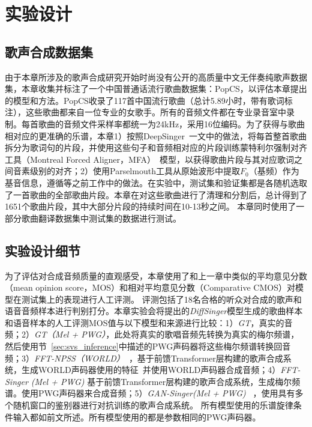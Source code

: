 \section{实验设计}
\subsection{歌声合成数据集}
由于本章所涉及的歌声合成研究开始时尚没有公开的高质量中文无伴奏纯歌声数据集，本章收集并标注了一个中国普通话流行歌曲数据集：PopCS，以评估本章提出的模型和方法。PopCS收录了117首中国流行歌曲（总计5.89小时，带有歌词标注），这些歌曲都来自一位专业的女歌手。所有的音频文件都在专业录音室中录制。每首歌曲的音频文件采样率都统一为24kHz，采用16位编码。为了获得与歌曲相对应的更准确的乐谱，本章1）按照DeepSinger~\citep{ren2020deepsinger}一文中的做法，将每首整首歌曲拆分为歌词句的片段，并使用这些句子和音频相对应的片段训练蒙特利尔强制对齐工具（Montreal Forced Aligner，MFA）~\citep{mcauliffe2017montreal}模型，以获得歌曲片段与其对应歌词之间音素级别的对齐；2）使用Parselmouth工具从原始波形中提取$F_0$（基频）作为基音信息，遵循\citet{wu2020adversarially,blaauw2020sequence,ren2020deepsinger}等之前工作中的做法。在实验中，测试集和验证集都是各随机选取了一首歌曲的全部歌曲片段。本章在对这些歌曲进行了清理和分割后，总计得到了1651个歌曲片段，其中大部分片段的持续时间在10-13秒之间。
本章同时使用了一部分歌曲翻译数据集中测试集的数据进行测试。
\subsection{实验设计细节}
为了评估对合成音频质量的直观感受，本章使用了和上一章中类似的平均意见分数（mean opinion score，MOS）和相对平均意见分数（Comparative CMOS）对模型在测试集上的表现进行人工评测。 评测包括了18名合格的听众对合成的歌声和语音音频样本进行判别打分。本章实验会将提出的\textit{DiffSinger}模型生成的歌曲样本和语音样本的人工评测MOS值与以下模型和来源进行比较：1）\textit{GT}，真实的音频；2）\textit{GT（Mel + PWG）}，此处将真实的歌唱音频先转换为真实的梅尔频谱，然后使用节~\ref{sec:svs_inference}中描述的PWG声码器将这些梅尔频谱转换回音频；3）\textit{FFT-NPSS（WORLD）}~\citep{blaauw2020sequence}，基于前馈Transformer层构建的歌声合成系统，生成WORLD声码器使用的特征~\citep{morise2016world}并使用WORLD声码器合成音频；4）\textit{FFT-Singer (Mel + PWG)} 基于前馈Transformer层构建的歌声合成系统，生成梅尔频谱。使用PWG声码器来合成音频；5）\textit{GAN-Singer(Mel + PWG)}
~\citep{wu2020adversarially}，使用具有多个随机窗口的鉴别器进行对抗训练的歌声合成系统。
所有模型使用的乐谱旋律条件输入都如前文所述。所有模型使用的都是参数相同的PWG声码器。

